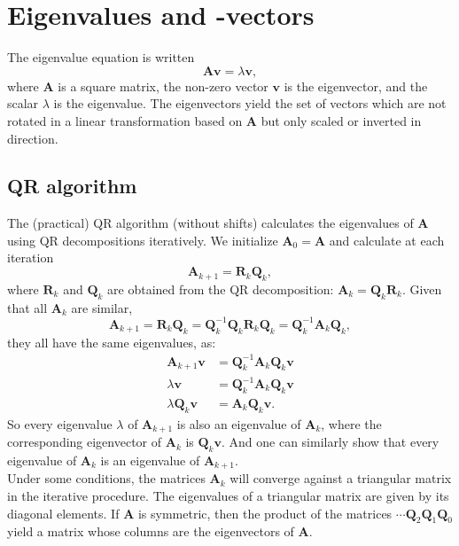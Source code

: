 \documentclass[11pt, a4paper, parskip=half*, bibliography=totoc, cleardoublepage=empty, final,
numbers=noenddot]{scrbook}
\begin{document}
\section{Eigenvalues and -vectors }
The eigenvalue equation is written 
\begin{equation}
\bm{A} \bm{v} = \lambda \bm{v}, 
\end{equation}
where $\bm{A}$ is a square matrix, the non-zero vector $\bm{v}$ is the eigenvector, and the scalar $\lambda$ is the eigenvalue. The eigenvectors yield the set of vectors which are not rotated in a linear transformation based on $\bm{A}$ but only scaled or inverted in direction.
\subsection{QR algorithm}
The (practical) QR algorithm (without shifts) calculates the eigenvalues of $\bm{A}$ using QR decompositions  iteratively. We initialize $\bm{A}_0 = \bm{A}$ and calculate at each iteration
\begin{equation}
\bm{A}_{k+1} = \bm{R}_k \bm{Q}_k,
\end{equation}
where $\bm{R}_k$ and $\bm{Q}_k$ are obtained from the QR decomposition: $\bm{A}_{k} = \bm{Q}_k \bm{R}_k$. Given that all $\bm{A}_k$ are similar,
\begin{equation}
\bm{A}_{k+1} = \bm{R}_k \bm{Q}_k = \bm{Q}^{-1}_k \bm{Q}_k \bm{R}_k \bm{Q}_k = \bm{Q}^{-1}_k \bm{A}_k \bm{Q}_k,
\end{equation}
they all have the same eigenvalues, as:
\begin{align}
\bm{A}_{k+1} \bm{v} &= \bm{Q}^{-1}_k \bm{A}_k \bm{Q}_k \bm{v} \\
\lambda \bm{v} &= \bm{Q}^{-1}_k \bm{A}_k \bm{Q}_k \bm{v} \\
\lambda \bm{Q}_k \bm{v} &=  \bm{A}_k \bm{Q}_k \bm{v}.
\end{align}
So every eigenvalue $\lambda$ of $\bm{A}_{k+1}$ is also an eigenvalue of $\bm{A}_{k}$, where the corresponding eigenvector of $\bm{A}_{k}$ is  $\bm{Q}_k \bm{v}$. And one can similarly show that every eigenvalue of $\bm{A}_{k}$ is an eigenvalue of $\bm{A}_{k+1}$. \\
Under some conditions, the matrices $\bm{A}_{k}$ will converge against a triangular matrix in the iterative procedure. The eigenvalues of a triangular matrix are given by its diagonal elements. If $\bm{A}$ is symmetric, then the product of the matrices $\cdots \bm{Q}_{2} \bm{Q}_{1} \bm{Q}_{0}$ yield a matrix whose columns are the eigenvectors of $\bm{A}$.
\end{document}
